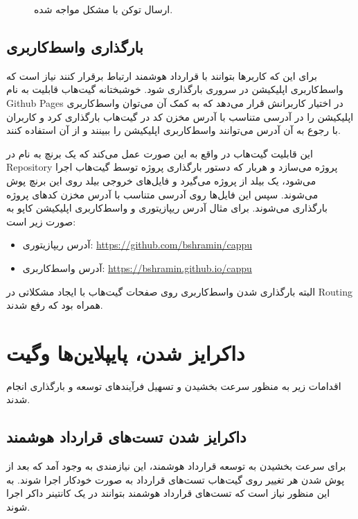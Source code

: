 \begin{figure}[H]
\centerline{}
\caption{ارسال توکن با مشکل مواجه شده.}
\label{fig:transfer-error}
\end{figure}















\subsection{بارگذاری واسط‌کاربری}
برای این که کاربرها بتوانند با قرارداد هوشمند ارتباط برقرار کنند نیاز است که واسط‌کاربری اپلیکیشن در سروری بارگذاری شود.
خوشبختانه گیت‌هاب قابلیت به نام
\gls{Github Pages}
در اختیار کاربرانش قرار می‌دهد
که به کمک آن می‌توان واسط‌کاربری اپلیکیشن را در آدرسی متناسب با آدرس مخزن کد در گیت‌هاب بارگذاری کرد
و کاربران با رجوع به آن آدرس می‌توانند واسط‌کاربری اپلیکیشن را ببینند و از آن استفاده کنند.

این قابلیت گیت‌هاب در واقع به این صورت عمل می‌کند که یک برنچ به نام
در
\gls{Repository}
پروژه می‌سازد و هربار که دستور بارگذاری پروژه توسط گیت‌هاب اجرا می‌شود،
یک بیلد از پروژه می‌گیرد و فایل‌های خروجی بیلد روی این برنچ پوش می‌شوند.
سپس این فایل‌ها روی آدرسی متناسب با آدرس مخزن کد‌های پروژه بارگذاری می‌شوند.
برای مثال آدرس ریپازیتوری و واسط‌کاربری اپلیکیشن کاپو به صورت زیر است:
\begin{itemize}
  \item
  آدرس ریپازیتوری: \url{https://github.com/bshramin/cappu}
  \item
  آدرس واسط‌کاربری: \url{https://bshramin.github.io/cappu}
\end{itemize}
البته بارگذاری شدن واسط‌کاربری روی صفحات گیت‌هاب با ایجاد مشکلاتی در
\gls{Routing}
همراه بود که رفع شدند.


\section{داکرایز شدن، پایپلاین‌ها وگیت}
اقدامات زیر به منظور سرعت بخشیدن و تسهیل فرآیندهای توسعه و بارگذاری انجام شدند.

\subsection{داکرایز شدن تست‌های قرارداد هوشمند}
برای سرعت بخشیدن به توسعه قرارداد هوشمند،
این نیازمندی به وجود آمد که بعد از پوش شدن هر تغییر روی گیت‌هاب تست‌های قرارداد به صورت خودکار اجرا شوند.
به این منظور نیاز است که تست‌های قرارداد هوشمند بتوانند در یک کانتینر داکر اجرا شوند.

